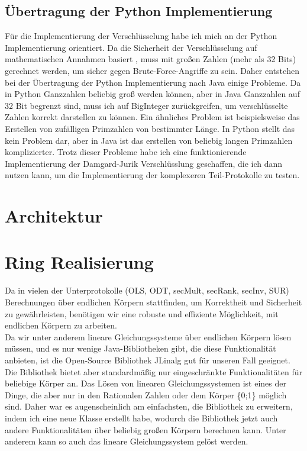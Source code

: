 \subsection{Übertragung der Python Implementierung}
Für die Implementierung der Verschlüsselung habe ich mich an der Python Implementierung \cite{swansonk14} orientiert. Da die Sicherheit der Verschlüsselung auf mathematischen Annahmen basiert  \cite{10.1007/3-540-48910-X_16}, muss mit großen Zahlen (mehr als 32 Bits) gerechnet werden, um sicher gegen Brute-Force-Angriffe zu sein. Daher entstehen bei der Übertragung der Python Implementierung nach Java einige Probleme. Da in Python Ganzzahlen beliebig groß werden können, aber in Java Ganzzahlen auf 32 Bit begrenzt sind, muss ich auf BigInteger zurückgreifen, um verschlüsselte Zahlen korrekt darstellen zu können.
Ein ähnliches Problem ist beispielsweise das Erstellen von zufälligen Primzahlen von bestimmter Länge. In Python stellt das kein Problem dar, aber in Java ist das erstellen von beliebig langen Primzahlen komplizierter. Trotz dieser Probleme habe ich eine funktionierende Implementierung der Damgard-Jurik Verschlüsslung geschaffen, die ich dann nutzen kann, um die Implementierung der komplexeren Teil-Protokolle zu testen.


\section{Architektur}
\section{Ring Realisierung}
Da in vielen der Unterprotokolle (OLS, ODT, secMult, secRank, secInv, SUR) Berechnungen über endlichen Körpern stattfinden, um Korrektheit und Sicherheit zu gewährleisten, benötigen wir eine robuste und effiziente Möglichkeit, mit endlichen Körpern zu arbeiten.\\
Da wir unter anderem lineare Gleichungssysteme über endlichen Körpern lösen müssen, und es nur wenige Java-Bibliotheken gibt, die diese Funktionalität anbieten, ist die Open-Source Bibliothek JLinalg \cite{JLinAlg} gut für unseren Fall geeignet. Die Bibliothek bietet aber standardmäßig nur eingeschränkte Funktionalitäten für beliebige Körper an. Das Lösen von linearen Gleichungssystemen ist eines der Dinge, die aber nur in den  Rationalen Zahlen oder dem Körper \{0;1\} möglich sind. Daher war es augenscheinlich am einfachsten, die Bibliothek zu erweitern, indem ich eine neue Klasse erstellt habe, wodurch die Bibliothek jetzt auch andere Funktionalitäten über beliebig großen Körpern berechnen kann. Unter anderem kann so auch das lineare Gleichungssystem gelöst werden.\\

